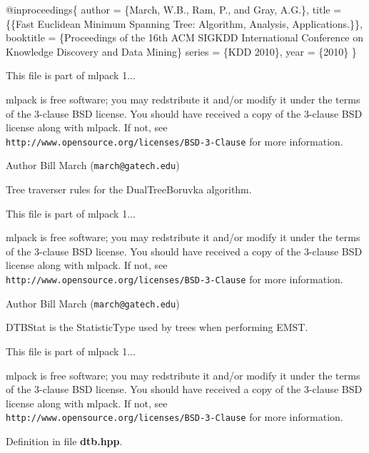 \begin{DoxyCode}
@inproceedings\{
  author = \{March, W.B., Ram, P., and Gray, A.G.\},
  title = \{\{Fast Euclidean Minimum Spanning Tree: Algorithm, Analysis,
     Applications.\}\},
  booktitle = \{Proceedings of the 16th ACM SIGKDD International Conference
     on Knowledge Discovery and Data Mining\}
  series = \{KDD 2010\},
  year = \{2010\}
\}
\end{DoxyCode}


This file is part of mlpack 1...

mlpack is free software; you may redstribute it and/or modify it under the terms of the 3-\/clause B\-S\-D license. You should have received a copy of the 3-\/clause B\-S\-D license along with mlpack. If not, see {\tt http\-://www.\-opensource.\-org/licenses/\-B\-S\-D-\/3-\/\-Clause} for more information.

\begin{DoxyAuthor}{Author}
Bill March ({\tt march@gatech.\-edu})
\end{DoxyAuthor}
Tree traverser rules for the Dual\-Tree\-Boruvka algorithm.

This file is part of mlpack 1...

mlpack is free software; you may redstribute it and/or modify it under the terms of the 3-\/clause B\-S\-D license. You should have received a copy of the 3-\/clause B\-S\-D license along with mlpack. If not, see {\tt http\-://www.\-opensource.\-org/licenses/\-B\-S\-D-\/3-\/\-Clause} for more information.

\begin{DoxyAuthor}{Author}
Bill March ({\tt march@gatech.\-edu})
\end{DoxyAuthor}
D\-T\-B\-Stat is the Statistic\-Type used by trees when performing E\-M\-S\-T.

This file is part of mlpack 1...

mlpack is free software; you may redstribute it and/or modify it under the terms of the 3-\/clause B\-S\-D license. You should have received a copy of the 3-\/clause B\-S\-D license along with mlpack. If not, see {\tt http\-://www.\-opensource.\-org/licenses/\-B\-S\-D-\/3-\/\-Clause} for more information. 

Definition in file {\bf dtb.\-hpp}.

